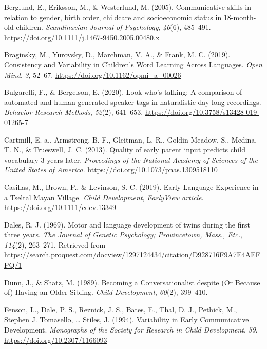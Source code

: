 \documentclass[
  man,mask,floatsintext]{apa6}
\newlength{\cslhangindent}
\newlength{\cslentryspacingunit} %
\newenvironment{CSLReferences}[2] %
 {%
  \setlength{\parindent}{0pt}
  \ifodd #1
  \let\oldpar\par
  \def\par{\hangindent=\cslhangindent\oldpar}
  \fi
  \setlength{\parskip}{#2\cslentryspacingunit}
 }%
 {}
\begin{document}
\begin{CSLReferences}{1}{0}
\leavevmode{}%
Berglund, E., Eriksson, M., \& Westerlund, M. (2005). Communicative skills in relation to gender, birth order, childcare and socioeconomic status in 18-month-old children. \emph{Scandinavian Journal of Psychology}, \emph{46}(6), 485--491. \url{https://doi.org/10.1111/j.1467-9450.2005.00480.x}

\leavevmode{}%
Braginsky, M., Yurovsky, D., Marchman, V. A., \& Frank, M. C. (2019). Consistency and {Variability} in {Children}'s {Word} {Learning} {Across} {Languages}. \emph{Open Mind}, \emph{3}, 52--67. \url{https://doi.org/10.1162/opmi_a_00026}

\leavevmode{}%
Bulgarelli, F., \& Bergelson, E. (2020). Look who's talking: {A} comparison of automated and human-generated speaker tags in naturalistic day-long recordings. \emph{Behavior Research Methods}, \emph{52}(2), 641--653. \url{https://doi.org/10.3758/s13428-019-01265-7}

\leavevmode{}%
Cartmill, E. a., Armstrong, B. F., Gleitman, L. R., Goldin-Meadow, S., Medina, T. N., \& Trueswell, J. C. (2013). Quality of early parent input predicts child vocabulary 3 years later. \emph{Proceedings of the National Academy of Sciences of the United States of America}. \url{https://doi.org/10.1073/pnas.1309518110}

\leavevmode{}%
Casillas, M., Brown, P., \& Levinson, S. C. (2019). Early {Language} {Experience} in a {Tseltal} {Mayan} {Village}. \emph{Child Development}, \emph{EarlyView article}. \url{https://doi.org/10.1111/cdev.13349}

\leavevmode{}%
Dales, R. J. (1969). Motor and language development of twins during the first three years. \emph{The Journal of Genetic Psychology; Provincetown, Mass., Etc.}, \emph{114}(2), 263--271. Retrieved from \url{https://search.proquest.com/docview/1297124434/citation/D928716F9A7E4AEFPQ/1}

\leavevmode{}%
Dunn, J., \& Shatz, M. (1989). Becoming a {Conversationalist} despite ({Or} {Because} of) {Having} an {Older} {Sibling}. \emph{Child Development}, \emph{60}(2), 399--410.

\leavevmode{}%
Fenson, L., Dale, P. S., Reznick, J. S., Bates, E., Thal, D. J., Pethick, M., Stephen J. Tomasello, \ldots{} Stiles, J. (1994). Variability in {Early} {Communicative} {Development}. \emph{Monographs of the Society for Research in Child Development}, \emph{59}. \url{https://doi.org/10.2307/1166093}


\end{CSLReferences}
\end{document}
